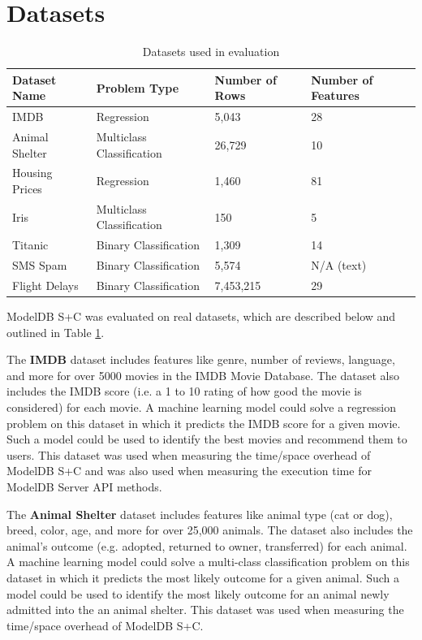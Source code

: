 \section{Datasets}
 \begin{table}
   \centering
    \begin{tabular}{ | l | l | l | l |}
      \hline
      Dataset Name & Problem Type & Number of Rows & Number of Features \\ \hline
      IMDB & Regression & 5,043 & 28 \\ \hline
      Animal Shelter & Multiclass Classification & 26,729 & 10 \\ \hline
      Housing Prices & Regression & 1,460 & 81 \\ \hline
      Iris & Multiclass Classification & 150 & 5 \\  \hline
      Titanic & Binary Classification & 1,309 & 14  \\  \hline
      SMS Spam & Binary Classification & 5,574 & N/A (text) \\  \hline
      Flight Delays & Binary Classification & 7,453,215 & 29 \\ 
      \hline
   \end{tabular}
   \caption{Datasets used in evaluation}
   \label{tab:datasets}
 \end{table}

ModelDB S+C was evaluated on real datasets, which are described below and outlined
in Table \ref{tab:datasets}.

The \textbf{IMDB} dataset \cite{imdb} includes features like genre, number of
reviews, language, and more for over 5000 movies in the IMDB Movie Database. The dataset
also includes the IMDB score (i.e. a 1 to 10 rating of how good the movie is considered)
for each movie. A machine learning model could solve a regression problem on this
dataset in which it predicts the IMDB score for a given movie. Such a model could
be used to identify the best movies and recommend them to users. This dataset
was used when measuring the time/space overhead of ModelDB S+C and was also used
when measuring the execution time for ModelDB Server API methods.

The \textbf{Animal Shelter} dataset \cite{animal} includes features like
animal type (cat or dog), breed, color, age, and more for over 25,000 animals. The
dataset also includes the animal's outcome (e.g. adopted, returned to owner, transferred)
for each animal. A machine learning model could solve a multi-class classification problem on this dataset
in which it predicts the most likely outcome for a given animal. Such a model could 
be used to identify the most likely outcome for an animal newly admitted into the
an animal shelter. This dataset was used when measuring the time/space overhead
of ModelDB S+C.

